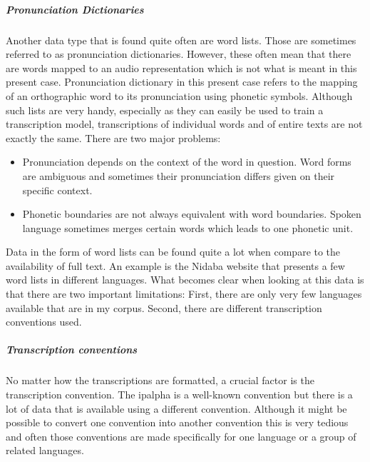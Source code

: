 \subparagraph{Pronunciation Dictionaries}
Another data type that is found quite often are word lists. Those are sometimes referred to as pronunciation dictionaries. However, these often mean that there are words mapped to an audio representation which is not what is meant in this present case. Pronunciation dictionary in this present case refers to the mapping of an orthographic word to its pronunciation using phonetic symbols. Although such lists are very handy, especially as they can easily be used to train a transcription model, transcriptions of individual words and of entire texts are not exactly the same. There are two major problems:

\begin{itemize}
\item Pronunciation depends on the context of the word in question. Word forms are ambiguous and sometimes their pronunciation differs given on their specific context. 
\item Phonetic boundaries are not always equivalent with word boundaries. Spoken language sometimes merges certain words which leads to one phonetic unit.
\end{itemize} 

Data in the form of word lists can be found quite a lot when compare to the availability of full text. An example is the Nidaba website that presents a few word lists in different languages. What becomes clear when looking at this data is that there are two important limitations: First, there are only very few languages available that are in my corpus. Second, there are different transcription conventions used.

\subparagraph{Transcription conventions}
No matter how the transcriptions are formatted, a crucial factor is the transcription convention. The \ac{ipalpha} is a well-known convention but there is a lot of data that is available using a different convention. Although it might be possible to convert one convention into another convention this is very tedious and often those conventions are made specifically for one language or a group of related languages. 

